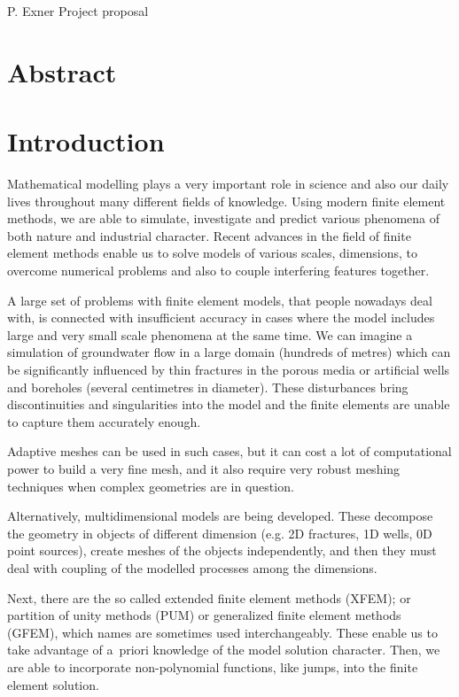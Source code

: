 \documentclass{sna}
\begin{document}
     {P. Exner}
     {Project proposal}


\section{Abstract}

\section{Introduction}
Mathematical modelling plays a very important role in science and also our daily lives throughout many different
fields of knowledge. Using modern finite element methods, we are able to simulate, investigate and predict
various phenomena of both nature and industrial character. Recent advances in the field of finite element methods
enable us to solve models of various scales, dimensions, to overcome numerical problems and also 
to couple interfering features together.

A large set of problems with finite element models, that people nowadays deal with, is connected with 
insufficient accuracy in cases where the model includes large and very small scale phenomena at the same time.
We can imagine a simulation of groundwater flow in a large domain (hundreds of metres) which can be significantly
influenced by thin fractures in the porous media or artificial wells and boreholes (several centimetres in diameter).
These disturbances bring discontinuities and singularities into the model and the finite elements are
unable to capture them accurately enough.

Adaptive meshes can be used in such cases, but it can cost a lot of computational power to build a very fine mesh,
and it also require very robust meshing techniques when complex geometries are in question.

Alternatively, multidimensional models are being developed. These decompose the geometry
in objects of different dimension (e.g. 2D fractures, 1D wells, 0D point sources), create meshes of the objects independently,
and then they must deal with coupling of the modelled processes among the dimensions. 

Next, there are the so called extended finite element methods (XFEM); or partition of unity methods (PUM) or generalized
finite element methods (GFEM), which names are sometimes used interchangeably. 
These enable us to take advantage of a~priori knowledge of the model solution character.
Then, we are able to incorporate non-polynomial functions, like jumps, into the finite element solution.
\newline{}
\end{document}
